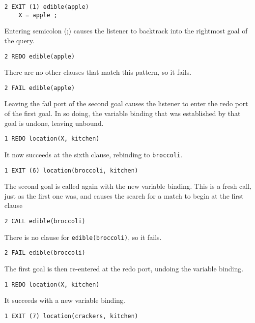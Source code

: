 \begin{verbatim}
2 EXIT (1) edible(apple)
    X = apple ;
\end{verbatim}

Entering semicolon (;) causes the listener to backtrack into the rightmost goal
of the query.

\begin{verbatim}
2 REDO edible(apple)
\end{verbatim}

There are no other clauses that match this pattern, so it fails.

\begin{verbatim}
2 FAIL edible(apple)
\end{verbatim}

Leaving the fail port of the second goal causes the listener to enter the redo
port of the first goal. In so doing, the variable binding that was established
by that goal is undone, leaving  unbound.

\begin{verbatim}
1 REDO location(X, kitchen)
\end{verbatim}

It now succeeds at the sixth clause, rebinding  to \verb|broccoli|.

\begin{verbatim}
1 EXIT (6) location(broccoli, kitchen)
\end{verbatim}

The second goal is called again with the new variable binding. This is a fresh
call, just as the first one was, and causes the search for a match to begin at
the first clause

\begin{verbatim}
2 CALL edible(broccoli)
\end{verbatim}

There is no clause for \verb|edible(broccoli)|, so it fails.

\begin{verbatim}
2 FAIL edible(broccoli)
\end{verbatim}

The first goal is then re-entered at the redo port, undoing the variable
binding.

\begin{verbatim}
1 REDO location(X, kitchen)
\end{verbatim}

It succeeds with a new variable binding.

\begin{verbatim}
1 EXIT (7) location(crackers, kitchen)
\end{verbatim}

